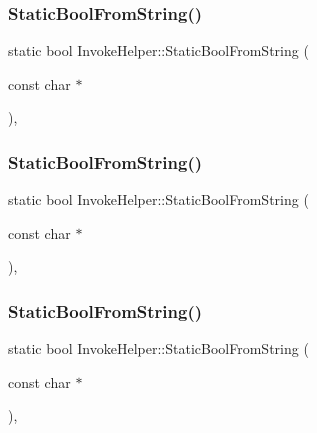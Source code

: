 \subsubsection{\texorpdfstring{StaticBoolFromString()}{StaticBoolFromString()}\hspace{0.1cm}{\footnotesize\ttfamily [1/3]}}
{\footnotesize\ttfamily static bool Invoke\+Helper\+::\+Static\+Bool\+From\+String (\begin{DoxyParamCaption}\item[{const char $\ast$}]{ }\end{DoxyParamCaption})\hspace{0.3cm}{\ttfamily [inline]}, {\ttfamily [static]}}

\mbox{\label{class_invoke_helper_aef16e38107cd8ddc0a52d7d0ab153211}} 
\subsubsection{\texorpdfstring{StaticBoolFromString()}{StaticBoolFromString()}\hspace{0.1cm}{\footnotesize\ttfamily [2/3]}}
{\footnotesize\ttfamily static bool Invoke\+Helper\+::\+Static\+Bool\+From\+String (\begin{DoxyParamCaption}\item[{const char $\ast$}]{ }\end{DoxyParamCaption})\hspace{0.3cm}{\ttfamily [inline]}, {\ttfamily [static]}}

\mbox{\label{class_invoke_helper_aef16e38107cd8ddc0a52d7d0ab153211}} 
\subsubsection{\texorpdfstring{StaticBoolFromString()}{StaticBoolFromString()}\hspace{0.1cm}{\footnotesize\ttfamily [3/3]}}
{\footnotesize\ttfamily static bool Invoke\+Helper\+::\+Static\+Bool\+From\+String (\begin{DoxyParamCaption}\item[{const char $\ast$}]{ }\end{DoxyParamCaption})\hspace{0.3cm}{\ttfamily [inline]}, {\ttfamily [static]}}

